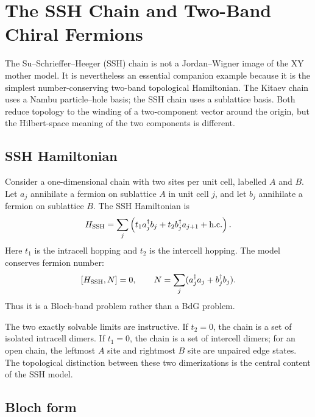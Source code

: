 \chapter{The SSH Chain and Two-Band Chiral Fermions}
\label{chap:ssh-chain-two-band-chiral-fermions}

The Su--Schrieffer--Heeger (SSH) chain is not a Jordan--Wigner image of the XY
mother model.  It is nevertheless an essential companion example because it is
the simplest number-conserving two-band topological Hamiltonian.  The Kitaev
chain uses a Nambu particle--hole basis; the SSH chain uses a sublattice basis.
Both reduce topology to the winding of a two-component vector around the origin,
but the Hilbert-space meaning of the two components is different.

\section{SSH Hamiltonian}
\label{sec:ssh-hamiltonian}

Consider a one-dimensional chain with two sites per unit cell, labelled $A$ and
$B$.  Let $a_j$ annihilate a fermion on sublattice $A$ in unit cell $j$, and let
$b_j$ annihilate a fermion on sublattice $B$.  The SSH Hamiltonian is
\begin{equation}
\label{eq:ssh-real-space-hamiltonian}
    H_{\rm SSH}
    =
    \sum_{j}
    \left(
        t_1 a_j^\dagger b_j
        +
        t_2 b_j^\dagger a_{j+1}
        +
        \text{h.c.}
    \right).
\end{equation}
Here $t_1$ is the intracell hopping and $t_2$ is the intercell hopping.  The
model conserves fermion number:
\begin{equation}
\label{eq:ssh-number-conservation}
    [H_{\rm SSH},N]=0,
    \qquad
    N=\sum_j(a_j^\dagger a_j+b_j^\dagger b_j).
\end{equation}
Thus it is a Bloch-band problem rather than a BdG problem.

The two exactly solvable limits are instructive.  If $t_2=0$, the chain is a set
of isolated intracell dimers.  If $t_1=0$, the chain is a set of intercell dimers;
for an open chain, the leftmost $A$ site and rightmost $B$ site are unpaired edge
states.  The topological distinction between these two dimerizations is the
central content of the SSH model.

\section{Bloch form}
\label{sec:ssh-bloch-form}

